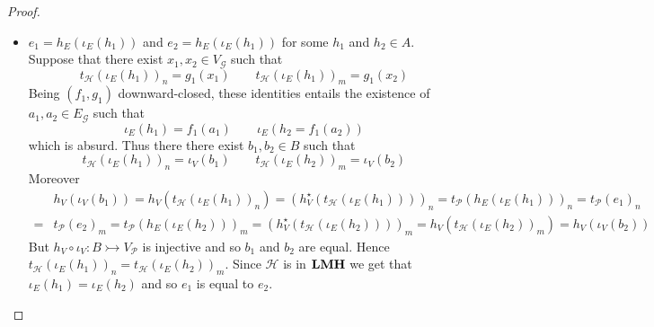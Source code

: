 \documentclass[3p]{elsarticle}
\newcommand{\catname}[1]{\textbf{\textup{#1}}}
\newcommand{\lmo}{\catname{LMH}}
\newcommand{\mto}{\rightarrowtail}
\theoremstyle{remark}
\theoremstyle{definition}
\begin{document}
\begin{proof}
\begin{itemize}
	\item $e_1=h_E(\iota_E(h_1))$ and $e_2=h_E(\iota_E(h_1))$ for some $h_1$ and $h_2\in A$.  Suppose that there exist $x_1, x_2\in V_{\mathcal{G}}$ such that
	\[t_{\mathcal{H}}(\iota_E(h_1))_n = g_1(x_1) \qquad t_{\mathcal{H}}(\iota_E(h_1))_m = g_1(x_2)\]
	Being $(f_1, g_1)$ downward-closed, these identities entails the existence of $a_1, a_2\in E_{\mathcal{G}}$ such that 
	\[\iota_E(h_1)=f_1(a_1) \qquad \iota_E(h_2 = f_1(a_2))\]
	which is absurd. Thus there there exist $b_1, b_2\in B$ such that
	\[t_{\mathcal{H}}(\iota_E(h_1))_n=\iota_V(b_1) \qquad t_{\mathcal{H}}(\iota_E(h_2))_m=\iota_V(b_2)\]
	Moreover
	\begin{align*}
	&h_V(\iota_V(b_1))=h_V(t_{\mathcal{H}}(\iota_E(h_1))_n)=(h^\star_V(t_{\mathcal{H}}(\iota_E(h_1))))_n=t_{\mathcal{P}}(h_E(\iota_E(h_1)))_n=t_{\mathcal{P}}(e_1)_n\\=&t_{\mathcal{P}}(e_2)_m=t_{\mathcal{P}}(h_E(\iota_E(h_2)))_m=(h^\star_V(t_{\mathcal{H}}(\iota_E(h_2))))_m=h_V(t_{\mathcal{H}}(\iota_E(h_2))_m)=h_V(\iota_V(b_2))
	\end{align*}
	But $h_V\circ \iota_V\colon B\mto V_{\mathcal{P}}$ is injective and so $b_1$ and $b_2$ are equal. Hence $t_{\mathcal{H}}(\iota_E(h_1))_n = t_{\mathcal{H}}(\iota_E(h_2))_m$. Since $\mathcal{H}$ is in $\lmo$ we get that $\iota_E(h_1)=\iota_E(h_2)$ and so $e_1$ is equal to $e_2$.
	\qedhere 
\end{itemize}
\end{proof}
\end{document}
